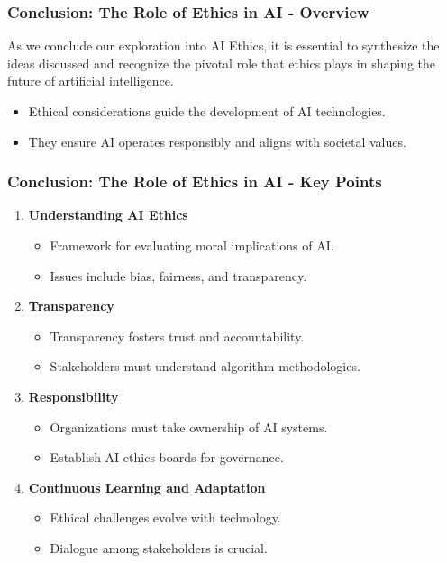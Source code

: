 \documentclass[aspectratio=169]{beamer}
\begin{document}
\begin{frame}[fragile]
    \frametitle{Conclusion: The Role of Ethics in AI - Overview}
    As we conclude our exploration into AI Ethics, it is essential to synthesize the ideas discussed and recognize the pivotal role that ethics plays in shaping the future of artificial intelligence.
    
    \begin{itemize}
        \item Ethical considerations guide the development of AI technologies.
        \item They ensure AI operates responsibly and aligns with societal values.
    \end{itemize}
\end{frame}

\begin{frame}[fragile]
    \frametitle{Conclusion: The Role of Ethics in AI - Key Points}
    \begin{enumerate}
        \item \textbf{Understanding AI Ethics}
        \begin{itemize}
            \item Framework for evaluating moral implications of AI.
            \item Issues include bias, fairness, and transparency.
        \end{itemize}
        \item \textbf{Transparency}
        \begin{itemize}
            \item Transparency fosters trust and accountability.
            \item Stakeholders must understand algorithm methodologies.
        \end{itemize}
        \item \textbf{Responsibility}
        \begin{itemize}
            \item Organizations must take ownership of AI systems.
            \item Establish AI ethics boards for governance.
        \end{itemize}
        \item \textbf{Continuous Learning and Adaptation}
        \begin{itemize}
            \item Ethical challenges evolve with technology.
            \item Dialogue among stakeholders is crucial.
        \end{itemize}
    \end{enumerate}
\end{frame}
\end{document}
